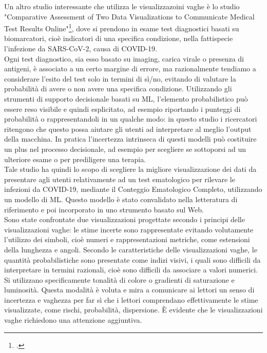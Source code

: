 Un altro studio interessante che utilizza le visualizzazoini vaghe è lo studio "Comparative Assessment of Two Data Visualizations to Communicate Medical Test Results Online"\footcite{womak:comparative-assesment}, dove si prendono in esame test diagnostici basati su biomarcatori, cioè indicatori di una specifica condizione, nella fattispecie l'infezione da SARS-CoV-2, causa di COVID-19.\\

Ogni test diagnostico, sia esso basato su imaging, carica virale o presenza di antigeni, è associato a un certo margine di errore, ma razionalmente tendiamo a considerare l'esito del test solo in termini di sì/no, evitando di valutare la probabilità di avere o non avere una specifica condizione. Utilizzando gli
strumenti di supporto decisionale basati su ML, l'elemento probabilistico può essere reso visibile e quindi esplicitato, ad esempio riportando i punteggi di probabilità o rappresentandoli in un qualche modo: in questo studio i ricercatori ritengono che questo possa aiutare gli utenti ad interpretare al meglio l'output della
macchina. In pratica l'incertezza intrinseca di questi modelli può costituire un plus nel processo decisionale, ad esempio per scegliere se sottoporsi ad un ulteriore esame o per prediligere una terapia.\\

Tale studio ha quindi lo scopo di scegliere la migliore visualizzazione dei dati da presentare agli utenti relativamente ad un test ematologico per rilevare le infezioni da COVID-19, mediante il Conteggio Ematologico Completo, utilizzando un modello di ML. Questo modello è stato convalidato nella letteratura di riferimento e poi incorporato in uno strumento basato sul Web.\\
Sono state confrontate due visualizzazioni progettate secondo i principi delle visualizzazioni vaghe:
le stime incerte sono rappresentate evitando volutamente l'utilizzo dei simboli, cioè numeri e
rappresentazioni metriche, come estensioni della lunghezza e angoli. Secondo le caratteristiche
delle visualizzazioni vaghe, le quantità probabilistiche sono presentate come indizi visivi, i quali
sono difficili da interpretare in termini razionali, cioè sono difficili da associare a valori numerici. Si
utilizzano specificamente tonalità di colore o gradienti di saturazione e luminosità. Questa
modalità è voluta e mira a comunicare ai lettori un senso di incertezza e vaghezza per far sì che i
lettori comprendano effettivamente le stime visualizzate, come rischi, probabilità, dispersione. È
evidente che le visualizzazioni vaghe richiedono una attenzione aggiuntiva.\\

